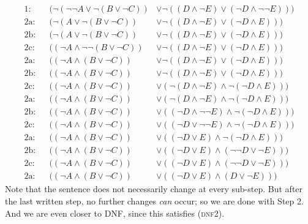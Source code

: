 {\small	\begin{align*}
		\text{1:} & & (\lnot (\lnot \lnot A \lor \lnot (B \lor \lnot C)) &\lor \lnot ((D \land \lnot E) \lor (\lnot D \land \lnot \lnot E)))\\
		\text{2a:} & & (\lnot (A \lor \lnot (B \lor \lnot  C)) &\lor \lnot ((D \land \lnot E) \lor (\lnot D \land  E)))\\
		\text{2b:} & & (\lnot (A \lor \lnot (B \lor \lnot  C)) &\lor \lnot ((D \land \lnot E) \lor (\lnot D \land  E)))\\
		\text{2c:} & & ((\lnot A \land \lnot \lnot (B \lor \lnot  C)) &\lor \lnot ((D \land \lnot E) \lor (\lnot D \land  E)))\\
		\text{2a:} & & ((\lnot A \land (B \lor \lnot  C)) &\lor \lnot ((D \land \lnot E) \lor (\lnot D \land  E)))\\
		\text{2b:} & & ((\lnot A \land (B \lor \lnot  C)) &\lor \lnot ((D \land \lnot E) \lor (\lnot D \land  E)))\\
		\text{2c:} & & ((\lnot A \land (B \lor \lnot  C)) &\lor  (\lnot(D \land \lnot E) \land \lnot (\lnot D \land  E)))\\
		\text{2a:} & & ((\lnot A \land (B \lor \lnot  C)) &\lor  (\lnot(D \land \lnot E) \land \lnot (\lnot D \land  E)))\\
		\text{2b:} & & ((\lnot A \land (B \lor \lnot  C)) &\lor  ((\lnot D \land \lnot \lnot E) \land \lnot (\lnot D \land  E)))\\
		\text{2c:} & & ((\lnot A \land (B \lor \lnot  C)) &\lor  ((\lnot D \lor \lnot \lnot E) \land \lnot (\lnot D \land  E)))\\
		\text{2a:} & & ((\lnot A \land (B \lor \lnot  C)) &\lor  ((\lnot D \lor E) \land \lnot (\lnot D \land  E)))\\
		\text{2b:} & & ((\lnot A \land (B \lor \lnot  C)) &\lor  ((\lnot D \lor E) \land (\lnot \lnot D \lor  \lnot E)))\\
		\text{2c:} & & ((\lnot A \land (B \lor \lnot  C)) &\lor  ((\lnot D \lor E) \land (\lnot \lnot D \lor  \lnot E)))\\
		\text{2a:} & & ((\lnot A \land (B \lor \lnot  C)) &\lor  ((\lnot D \lor E) \land (D \lor  \lnot E))) 
	\end{align*}}\noindent 
Note that the sentence does not necessarily change at every sub-step. But after the last written step, no further changes \emph{can} occur; so we are done with Step 2. And we are even closer to DNF, since this satisfies (\textsc{dnf2}). 

